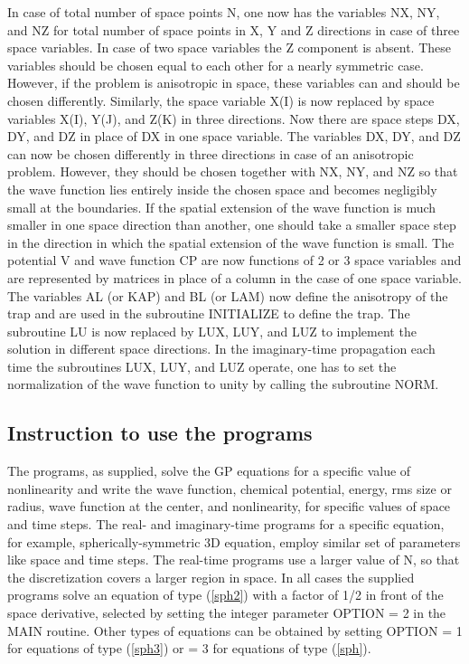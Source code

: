 \documentclass[onecolumn]{elsart3p}
\begin{document}
In case of total number of space points N, one now has the variables NX, NY, and
NZ for total number of space points in X, Y and Z directions in case of three
space variables. In case of two space variables the Z component is absent. These
variables
should be chosen equal to each other for a nearly  symmetric case. However, if
the problem is anisotropic in space, these variables can and should be chosen
differently. Similarly, the space variable X(I) is now replaced by space
variables X(I), Y(J), and Z(K) in three directions. Now there are space steps
DX, DY, and DZ in place of DX in one space variable. The variables DX, DY, and
DZ can now be chosen differently in three directions in case of an anisotropic
problem. However, they should  be chosen together with NX, NY, and NZ so that
the wave function lies entirely inside the chosen space and becomes negligibly
small at the boundaries. If the spatial extension of the wave function is much
smaller in one space direction than another, one should take a smaller space
step in the direction in which the spatial extension of the wave function is
small. The potential V and wave function CP      are now functions of 2 or 3
space variables and are represented by matrices in place of a column in the case
of one space variable. The variables AL (or KAP) and BL (or LAM) now define the
anisotropy of the trap and are used in the subroutine INITIALIZE to define the
trap. The subroutine LU is now replaced by LUX, LUY, and LUZ to implement the
solution in different space directions. In the imaginary-time propagation each
time the subroutines LUX, LUY, and LUZ  operate, one has to set the
normalization of the wave function to unity by calling the subroutine NORM.


\subsection{Instruction to use the programs}
\label{howto}

The programs, as supplied, solve the GP equations for a specific value of
nonlinearity and write the wave function, chemical potential, energy, rms size
or radius, wave function at the center, and nonlinearity, for  specific values
of space and time steps. The real- and imaginary-time programs for a 
specific
equation, for example, spherically-symmetric 3D equation, employ similar set of
parameters like space and time steps. The real-time programs use a larger value
of N, so that the discretization covers a larger region in space. In all cases
the supplied programs solve an equation of type (\ref{sph2}) with a factor of
1/2 in front of the space derivative, selected by setting the integer parameter
OPTION = 2 in the MAIN routine.  Other types of equations can be obtained by
setting OPTION = 1 for equations of type  (\ref{sph3}) or = 3 for equations of
type (\ref{sph}).
\end{document}
